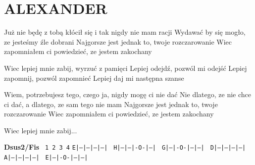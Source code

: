 \documentclass[../../../songbook.tex]{subfiles}
\begin{document}
\TabPositions{9cm} %
\section*{ALEXANDER}
{}
\vspace{0.5cm}
Już nie będę z tobą kłócił się i tak nigdy nie mam racji 	 \newline
Wydawać by się mogło, ze jesteśmy źle dobrani 		  		 \newline
Najgorsze jest jednak to, twoje rozczarowanie 		  		 \newline
Wiec zapomniałem ci powiedzieć, ze jestem zakochany  		 \newline

\-\hspace{1cm} Wiec lepiej mnie zabij, wyrzuć z pamięci 	  \newline
\-\hspace{1cm} Lepiej odejdź, pozwól mi odejść 				 \newline
\-\hspace{1cm} Lepiej zapomnij, pozwól zapomnieć			 \newline
\-\hspace{1cm} Lepiej daj mi następna szanse  				 \newline

Wiem, potrzebujesz tego, czego ja, nigdy mogę ci nie dać \newline
Nie dlatego, ze nie chce ci dać, a dlatego, ze sam tego nie mam \newline
Najgorsze jest jednak to, twoje rozczarowanie \newline
Wiec zapomniałem ci powiedzieć, ze jestem zakochany \newline

\-\hspace{1cm} Wiec lepiej mnie zabij... \newline

{\color{red}\textbf{Dsus2/Fis} } \newline
 \texttt{   1   2   3   4}	\newline
 \texttt{E|---|---|---|---| }	\newline
 \texttt{H|---|---|-O-|---| }	\newline
 \texttt{G|---|-O-|---|---|  }	\newline
 \texttt{D|---|---|---|---| }	\newline
 \texttt{A|---|---|---|---| }	\newline
 \texttt{E|---|-O-|---|---|}	\newline
\end{document}

